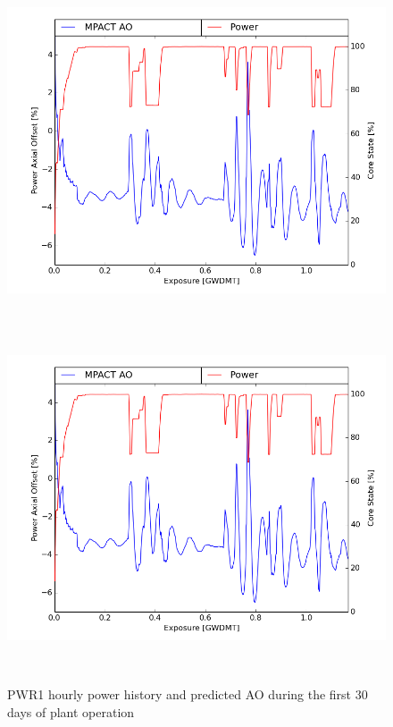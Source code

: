 \documentclass[edeposit,fullpage,11pt]{uiucthesis2009}
\begin{document}
\begin{figure}[h]
\begin{center}
\includegraphics[height=4in]{./Figures/AO_1_clean.png} %
\includegraphics[height=4in]{./Figures/AO_1_clean.png} %
\end{center}
\caption{PWR1 hourly power history and predicted \gls{AO} during the first 30 days of plant operation}
\label{lf_his1}
\end{figure}
\end{document}

